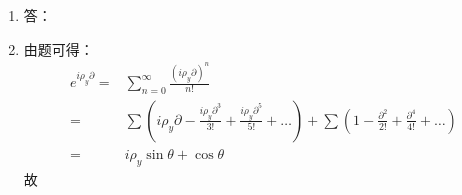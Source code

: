 \begin{enumerate}
\item 答：%
\item 由题可得：
\begin{equation}
\begin{aligned}
e^{i \rho_{y} \partial} =& \sum_{n=0}^{\infty} \frac{(i \rho_y \partial)^{n}}{n!} \\
=& \sum (i\rho_y \partial - \frac{i\rho_y \partial^3}{3!} + \frac{i\rho_y \partial^5}{5!} + \dots) + \sum (1 - \frac{\partial^2}{2!} + \frac{\partial^4}{4!} + \dots) \\
=& i\rho_y \sin{\theta} + \cos{\theta} 
\end{aligned}
\end{equation}
故
\end{enumerate}